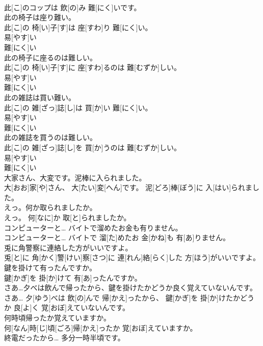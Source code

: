 \documentclass[8pt]{extreport}
\begin{document}
\begin{CJK}{UTF8}{min}
\\	此[こ]のコップは 飲[の]み 難[にく]いです。
\\	此の椅子は座り難い。	
\\	此[こ]の 椅[い]子[す]は 座[すわ]り 難[にく]い。 
\\	易[やす]い 
\\	難[にく]い 
\\	此の椅子に座るのは難しい。	
\\	此[こ]の 椅[い]子[す]に 座[すわ]るのは 難[むずか]しい。 
\\	易[やす]い 
\\	難[にく]い 
\\	此の雑誌は買い難い。	
\\	此[こ]の 雑[ざっ]誌[し]は 買[か]い 難[にく]い。 
\\	易[やす]い 
\\	難[にく]い 
\\	此の雑誌を買うのは難しい。	
\\	此[こ]の 雑[ざっ]誌[し]を 買[か]うのは 難[むずか]しい。 
\\	易[やす]い 
\\	難[にく]い 
\\	大家さん、大変です。泥棒に入られました。	
\\	大[おお]家[や]さん、 大[たい]変[へん]です。 泥[どろ]棒[ぼう]に 入[はい]られました。
\\	えっ。何か取られましたか。	
\\	えっ。 何[なに]か 取[と]られましたか。
\\	コンピューターと… バイトで溜めたお金も有りません。	
\\	コンピューターと… バイトで 溜[た]めたお 金[かね]も 有[あ]りません。
\\	兎に角警察に連絡した方がいいですよ。	
\\	兎[と]に 角[かく]警[けい]察[さつ]に 連[れん]絡[らく]した 方[ほう]がいいですよ。
\\	鍵を掛けて有ったんですか。	
\\	鍵[かぎ]を 掛[か]けて 有[あ]ったんですか。
\\	さあ…夕べは飲んで帰ったから、鍵を掛けたかどうか良く覚えていないんです。	
\\	さあ… 夕[ゆう]べは 飲[の]んで 帰[かえ]ったから、 鍵[かぎ]を 掛[か]けたかどうか 良[よ]く 覚[おぼ]えていないんです。
\\	何時頃帰ったか覚えていますか。	
\\	何[なん]時[じ]頃[ごろ]帰[かえ]ったか 覚[おぼ]えていますか。
\\	終電だったから… 多分一時半頃です。	

\end{CJK}
\end{document}

